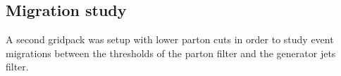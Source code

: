 \subsection{Migration study}

A second gridpack was setup with lower parton cuts in order to study event migrations between the thresholds of the parton filter and the generator jets filter.













